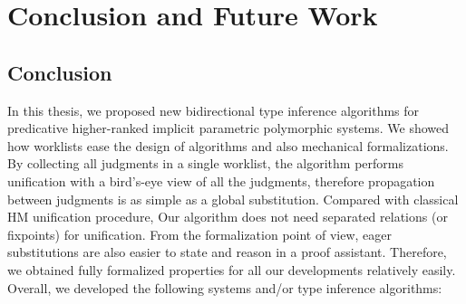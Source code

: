 \chapter{Conclusion and Future Work}
\label{chap:conclusion}


\section{Conclusion}

In this thesis, we proposed new bidirectional type inference algorithms for
predicative higher-ranked implicit parametric polymorphic systems.
We showed how worklists ease the design of algorithms
and also mechanical formalizations.
By collecting all judgments in a single worklist,
the algorithm performs unification with a bird's-eye view of all the judgments,
therefore propagation between judgments is as simple as a global substitution.
Compared with classical HM unification procedure,
Our algorithm does not need separated relations (or fixpoints) for unification.
From the formalization point of view,
eager substitutions are also easier to state and reason in a proof assistant.
Therefore, we obtained fully formalized properties for all our developments
relatively easily.
Overall, we developed the following systems and/or type inference algorithms:

